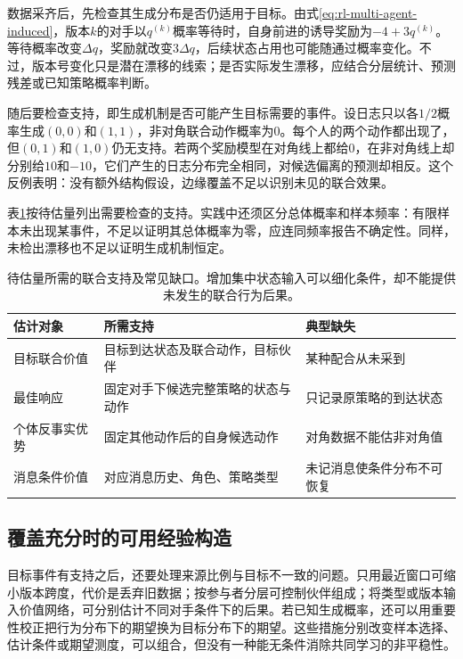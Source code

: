 数据采齐后，先检查其生成分布是否仍适用于目标。由式\eqref{eq:rl-multi-agent-induced}，版本$k$的对手以$q^{(k)}$概率等待时，自身前进的诱导奖励为$-4+3q^{(k)}$。等待概率改变$\Delta q$，奖励就改变$3\Delta q$，后续状态占用也可能随通过概率变化。不过，版本号变化只是潜在漂移的线索；是否实际发生漂移，应结合分层统计、预测残差或已知策略概率判断。

随后要检查支持，即生成机制是否可能产生目标需要的事件。设日志只以各$1/2$概率生成$(0,0)$和$(1,1)$，非对角联合动作概率为0。每个人的两个动作都出现了，但$(0,1)$和$(1,0)$仍无支持。若两个奖励模型在对角线上都给0，在非对角线上却分别给$10$和$-10$，它们产生的日志分布完全相同，对候选偏离的预测却相反。这个反例表明：没有额外结构假设，边缘覆盖不足以识别未见的联合效果。

表\ref{tab:rl-multi-agent-support}按待估量列出需要检查的支持。实践中还须区分总体概率和样本频率：有限样本未出现某事件，不足以证明其总体概率为零，应连同频率报告不确定性。同样，未检出漂移也不足以证明生成机制恒定。

\begin{table}[htbp]
 \centering
 \begin{tabularx}{\linewidth}{@{}l >{\raggedright\arraybackslash}X >{\raggedright\arraybackslash}X@{}}
 \toprule
 估计对象 & 所需支持 & 典型缺失\\
 \midrule
 目标联合价值 & 目标到达状态及联合动作，目标伙伴 & 某种配合从未采到\\
 最佳响应 & 固定对手下候选完整策略的状态与动作 & 只记录原策略的到达状态\\
 个体反事实优势 & 固定其他动作后的自身候选动作 & 对角数据不能估非对角值\\
 消息条件价值 & 对应消息历史、角色、策略类型 & 未记消息使条件分布不可恢复\\
 \bottomrule
 \end{tabularx}
 \caption{待估量所需的联合支持及常见缺口。增加集中状态输入可以细化条件，却不能提供未发生的联合行为后果。}
 \label{tab:rl-multi-agent-support}
\end{table}

\subsection{覆盖充分时的可用经验构造}
\label{sec:rl-multi-agent-reweight}

目标事件有支持之后，还要处理来源比例与目标不一致的问题。只用最近窗口可缩小版本跨度，代价是丢弃旧数据；按参与者分层可控制伙伴组成；将类型或版本输入价值网络，可分别估计不同对手条件下的后果。若已知生成概率，还可以用重要性校正把行为分布下的期望换为目标分布下的期望。这些措施分别改变样本选择、估计条件或期望测度，可以组合，但没有一种能无条件消除共同学习的非平稳性。

